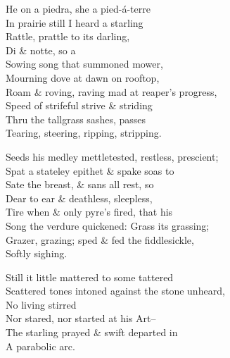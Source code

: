 He on a piedra, she a pied-á-terre \\
In prairie still I heard a starling \\
Rattle, prattle to its darling, \\
Di \& notte, so a \\
Sowing song that summoned mower, \\
Mourning dove at dawn on rooftop, \\
Roam \& roving, raving mad at reaper's progress, \\
Speed of strifeful strive \& striding \\
Thru the tallgrass sashes, passes \\
Tearing, steering, ripping, stripping.

Seeds his medley mettletested, restless, prescient; \\
Spat a stateley epithet \& spake soas to \\
Sate the breast, \& sans all rest, so \\
Dear to ear \& deathless, sleepless, \\
Tire when \& only pyre's fired, that his \\
Song the verdure quickened: Grass its grassing; \\
Grazer, grazing; sped \& fed the fiddlesickle, \\
Softly sighing.

Still it little mattered to some tattered \\
Scattered tones intoned against the stone unheard, \\
No living stirred \\
Nor stared, nor started at his Art-- \\
The starling prayed \& swift departed in \\
A parabolic arc.